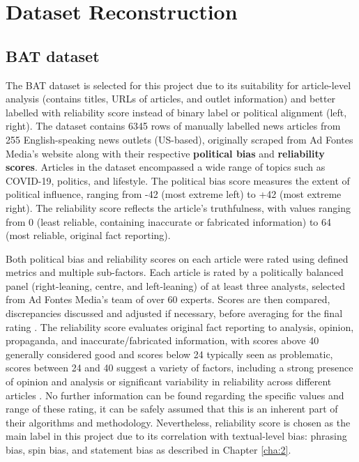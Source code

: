 \chapter{Dataset Reconstruction}
\label{cha:3}

\section{BAT dataset} \label{bat-characteristics}

The BAT dataset \cite{spinde-2023-bat} is selected for this project due to its suitability for article-level analysis (contains titles, URLs of articles, and outlet information) and better labelled with reliability score instead of binary label or political alignment (left, right). The dataset contains 6345 rows of manually labelled news articles from 255 English-speaking news outlets (US-based), originally scraped from Ad Fontes Media's website along with their respective \textbf{political bias} and \textbf{reliability scores}. Articles in the dataset encompassed a wide range of topics such as COVID-19, politics, and lifestyle. The political bias score measures the extent of political influence, ranging from -42 (most extreme left) to +42 (most extreme right). The reliability score reflects the article's truthfulness, with values ranging from 0 (least reliable, containing inaccurate or fabricated information) to 64 (most reliable, original fact reporting).

Both political bias and reliability scores on each article were rated using defined metrics and multiple sub-factors. Each article is rated by a politically balanced panel (right-leaning, centre, and left-leaning) of at least three analysts, selected from Ad Fontes Media's team of over 60 experts. Scores are then compared, discrepancies discussed and adjusted if necessary, before averaging for the final rating \cite{adfontes-methodology}. The reliability score evaluates original fact reporting to analysis, opinion, propaganda, and inaccurate/fabricated information, with scores above 40 generally considered good and scores below 24 typically seen as problematic, scores between 24 and 40 suggest a variety of factors, including a strong presence of opinion and analysis or significant variability in reliability across different articles \cite{adfontes-bias-reliability}. No further information can be found regarding the specific values and range of these rating, it can be safely assumed that this is an inherent part of their algorithms and methodology. Nevertheless, reliability score is chosen as the main label in this project due to its correlation with textual-level bias: phrasing bias, spin bias, and statement bias as described in Chapter \ref{cha:2}.

